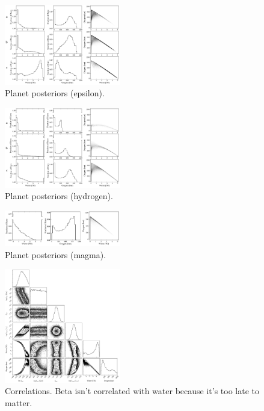 \documentclass[]{emulateapj}
\begin{document}
\begin{figure}[hbt]
  \begin{center}
      \includegraphics[width=0.45\textwidth]{figures/planet_epsilon.pdf}
       \caption{Planet posteriors (epsilon).}
     \label{fig:planet_epsilon}
  \end{center}
\end{figure}

\begin{figure}[hbt]
  \begin{center}
      \includegraphics[width=0.45\textwidth]{figures/planet_hydrogen.pdf}
       \caption{Planet posteriors (hydrogen).}
     \label{fig:planet_hydrogen}
  \end{center}
\end{figure}

\begin{figure}[hbt]
  \begin{center}
      \includegraphics[width=0.45\textwidth]{figures/planet_magma.pdf}
       \caption{Planet posteriors (magma).}
     \label{fig:planet_hydrogen}
  \end{center}
\end{figure}

\begin{figure}[hbt]
  \begin{center}
      \includegraphics[width=0.45\textwidth]{figures/corner.pdf}
       \caption{Correlations. Beta isn't correlated with water because it's too late to matter.}
     \label{fig:corner}
  \end{center}
\end{figure}

\clearpage


\end{document}
